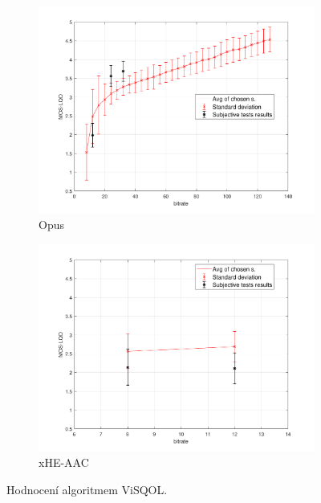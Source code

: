 \begin{figure}[h]\ContinuedFloat
        \begin{subfigure}{.5\textwidth}
        \centering
        \includegraphics[width=1\linewidth]{pic/objective/opusVisqol.pdf}
        \caption{Opus}
        \label{fig:vis:sub5}
    \end{subfigure}%
        \begin{subfigure}{.5\textwidth}
        \centering
        \includegraphics[width=1\linewidth]{pic/objective/xheVisqol.pdf}
        \caption{xHE-AAC}
        \label{fig:vis:sub6}
    \end{subfigure}%
    \caption{Hodnocení algoritmem ViSQOL.} 
\label{pic:res:Visqol}
\end{figure}

